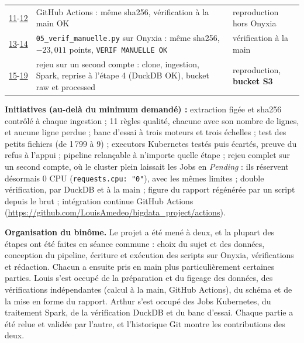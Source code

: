 \documentclass[10pt,a4paper]{article}
\newcommand{\code}[1]{\texttt{\small #1}}
\begin{document}
{\begin{tabularx}{\linewidth}{@{}r >{\raggedright\arraybackslash}X >{\raggedright\arraybackslash}p{4.3cm}@{}}
\href{https://raw.githubusercontent.com/LouisAmedeo/bigdata_project/main/evidence/11_github_actions_run.png}{11}-\href{https://raw.githubusercontent.com/LouisAmedeo/bigdata_project/main/evidence/12_github_actions_verif_ok.png}{12} & GitHub Actions : même sha256, vérification à la main OK & reproduction hors Onyxia \\
\href{https://raw.githubusercontent.com/LouisAmedeo/bigdata_project/main/evidence/13_verif_manuelle_onyxia.png}{13}-\href{https://raw.githubusercontent.com/LouisAmedeo/bigdata_project/main/evidence/14_verif_manuelle_debut_sha256.png}{14} & \code{05\_verif\_manuelle.py} sur Onyxia : même sha256, $-23{,}011$ points, \code{VERIF MANUELLE OK} & vérification à la main \\
\href{https://raw.githubusercontent.com/LouisAmedeo/bigdata_project/main/evidence/15_rejeu_clone_compte_louis.png}{15}-\href{https://raw.githubusercontent.com/LouisAmedeo/bigdata_project/main/evidence/19_rejeu_s3_raw_processed.png}{19} & rejeu sur un second compte : clone, ingestion, Spark, reprise à l'étape 4 (DuckDB OK), bucket raw et processed & reproduction, \textbf{bucket S3} \\
\bottomrule
\end{tabularx}}

\textbf{Initiatives (au-delà du minimum demandé) :} extraction figée et sha256 contrôlé à chaque ingestion ; 11 règles qualité, chacune avec son nombre de lignes, et aucune ligne perdue ; banc d'essai à trois moteurs et trois échelles ; test des petits fichiers (de 1\,799 à 9) ; executors Kubernetes testés puis écartés, preuve du refus à l'appui ; pipeline relançable à n'importe quelle étape ; rejeu complet sur un second compte, où le cluster plein laissait les Jobs en \emph{Pending} : ils réservent désormais 0 CPU (\code{requests.cpu: "0"}), avec les mêmes limites ; double vérification, par DuckDB et à la main ; figure du rapport régénérée par un script depuis le brut ; intégration continue GitHub Actions (\url{https://github.com/LouisAmedeo/bigdata_project/actions}).

\textbf{Organisation du binôme.} Le projet a été mené à deux, et la plupart des étapes ont été faites en séance commune : choix du sujet et des données, conception du pipeline, écriture et exécution des scripts sur Onyxia, vérifications et rédaction. Chacun a ensuite pris en main plus particulièrement certaines parties. Louis s'est occupé de la préparation et du figeage des données, des vérifications indépendantes (calcul à la main, GitHub Actions), du schéma et de la mise en forme du rapport. Arthur s'est occupé des Jobs Kubernetes, du traitement Spark, de la vérification DuckDB et du banc d'essai. Chaque partie a été relue et validée par l'autre, et l'historique Git montre les contributions des deux.
\end{document}
